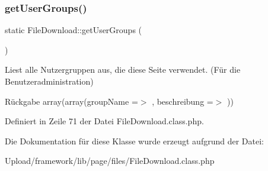 \subsubsection{\texorpdfstring{get\+User\+Groups()}{getUserGroups()}}
{\footnotesize\ttfamily static File\+Download\+::get\+User\+Groups (\begin{DoxyParamCaption}{ }\end{DoxyParamCaption})\hspace{0.3cm}{\ttfamily [static]}}

Liest alle Nutzergruppen aus, die diese Seite verwendet. (Für die Benutzeradministration) \begin{DoxyReturn}{Rückgabe}
array(array(\textquotesingle{}group\+Name\textquotesingle{} =$>$ \textquotesingle{}\textquotesingle{}, \textquotesingle{}beschreibung\textquotesingle{} =$>$ \textquotesingle{}\textquotesingle{})) 
\end{DoxyReturn}


Definiert in Zeile 71 der Datei File\+Download.\+class.\+php.



Die Dokumentation für diese Klasse wurde erzeugt aufgrund der Datei\+:\begin{DoxyCompactItemize}
\item 
Upload/framework/lib/page/files/File\+Download.\+class.\+php\end{DoxyCompactItemize}
